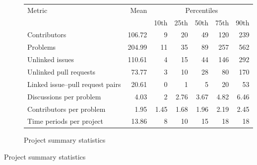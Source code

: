 \begin{figure}[ht]

    \caption{Descriptive statistics of key project metrics} \label{fig:summary-stats}
  
  \centering
  \medskip

\begin{subfigure}[b]{0.9\textwidth}
  \centering
  \footnotesize
  \caption{Project summary statistics}
  \label{fig:project-summary-stats}
  \begin{tabular}{@{}l r *{5}{r}@{}}
    \toprule
    Metric                        & Mean   & \multicolumn{5}{c}{Percentiles} \\
    \cmidrule(lr){3-7}
                                  &        & 10th   & 25th   & 50th   & 75th   & 90th   \\
    \midrule
    Contributors                   & 106.72 & 9      & 20     & 49     & 120    & 239    \\
    Problems                       & 204.99 & 11     & 35     & 89     & 257    & 562    \\
    Unlinked issues                & 110.61 & 4      & 15     & 44     & 146    & 292    \\
    Unlinked pull requests         & 73.77  & 3      & 10     & 28     & 80     & 170    \\
    Linked issue–pull request pairs & 20.61  & 0      & 1      & 5      & 20     & 53     \\
    Discussions per problem        & 4.03   & 2      & 2.76   & 3.67   & 4.82   & 6.46   \\
    Contributors per problem       & 1.95   & 1.45   & 1.68   & 1.96   & 2.19   & 2.45   \\
    Time periods per project       & 13.86  & 8      & 10     & 15     & 18     & 18     \\
    \bottomrule
  \end{tabular}
\end{subfigure}

  \bigskip


\end{figure}
